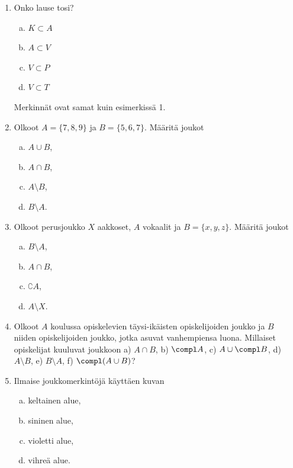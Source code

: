 


\Harjoitustehtavat

\begin{enumerate}

\item Onko lause tosi?
\begin{enumerate}[a)]
\item $K \subset A$
\item $A \subset V$
\item $V \subset P$
\item $V \subset T$
\end{enumerate}
Merkinnät ovat samat kuin esimerkissä 1.

\item Olkoot $A = \{7, 8, 9\}$ ja $B=\{5, 6, 7\}$. Määritä joukot
\begin{enumerate}[a)]
\item $A \cup B$,
\item $A \cap B$,
\item $A \setminus B$,
\item $B \setminus A$.
\end{enumerate}

\item Olkoot perusjoukko $X$ aakkoset, $A$ vokaalit ja $B=\{x, y, z\}$.
Määritä joukot
\begin{enumerate}[a)]
\item $B\setminus A$,
\item $A\cap B$,
\item $\complement A$,
\item $A \setminus X$.
\end{enumerate}


\item
Olkoot $A$ koulussa opiskelevien täysi-ikäisten opiskelijoiden joukko ja $B$ niiden opiskelijoiden joukko, jotka asuvat vanhempiensa luona. Millaiset opiskelijat kuuluvat joukkoon a) $A \cap B$,  b) $\compl A$, c) $A \cup \compl B$, d) $A\setminus B$, e) $B \setminus A$, f) $\compl (A \cup B)$?

\item
Ilmaise joukkomerkintöjä käyttäen kuvan
\begin{enumerate}[a)]
\item keltainen alue,
\item sininen alue,
\item violetti alue,
\item vihreä alue.
\end{enumerate}


\end{enumerate}
